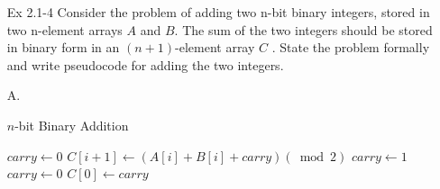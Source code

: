 \documentclass[fontsize=12pt,paper=a4]{book}
\newcommand{\To}{\ \textbf{to}\ }
\begin{document}
\begin{enumerate}
 \item[Ex 2.1-4]
       Consider the problem of adding two n-bit binary integers, stored in two n-element arrays $A$ and $B$. The sum of the two integers should be stored in binary form in an $(n + 1)$-element array $C$ . State the problem formally and write pseudocode for
       adding the two integers.
 \item[A.]
       \begin{algorithm}
        \caption{$n$-bit Binary Addition}
        \begin{algorithmic}[1]
         \State $carry \gets 0$
         \For{$i \gets n-1 \To 0$}
         \State $C[i+1] \gets (A[i] + B[i]+carry) (\bmod 2)$
         \State $carry \gets 1$
         \Else
         \State $carry \gets 0$
         \EndIf
         \EndFor
         \State $C[0] \gets carry$
         \EndProcedure
        \end{algorithmic}
       \end{algorithm}
\end{enumerate}
\end{document}
